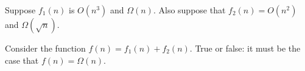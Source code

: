 \begin{prob}
    Suppose $f_1(n)$ is $O(n^3)$ and $\Omega(n)$. Also suppose that $f_2(n) = O(n^2)$ and $\Omega(\sqrt n)$.

    Consider the function $f(n) = f_1(n) + f_2(n)$. True or false: it must be 
    the case that $f(n) = \Omega(n)$.

    \Tf{}
\end{prob}
